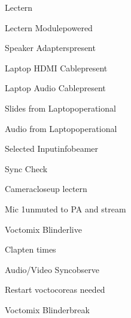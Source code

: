 \begin{checklist}{Lectern}
  \item{Lectern Module}{powered}
  \item{Speaker Adapters}{present}
  \item{Laptop HDMI Cable}{present}
  \item{Laptop Audio Cable}{present}
  \item{Slides from Laptop}{operational}
  \item{Audio from Laptop}{operational}
  \item{Selected Input}{infobeamer}
\end{checklist}

\begin{checklist}{Sync Check}
  \item{Camera}{closeup lectern}
  \item{Mic 1}{unmuted to PA and stream}
  \item{Voctomix Blinder}{live}
  \item{Clap}{ten times}
  \item{Audio/Video Sync}{observe}
  \item{Restart voctocore}{as needed}
  \item{Voctomix Blinder}{break}

\end{checklist}


